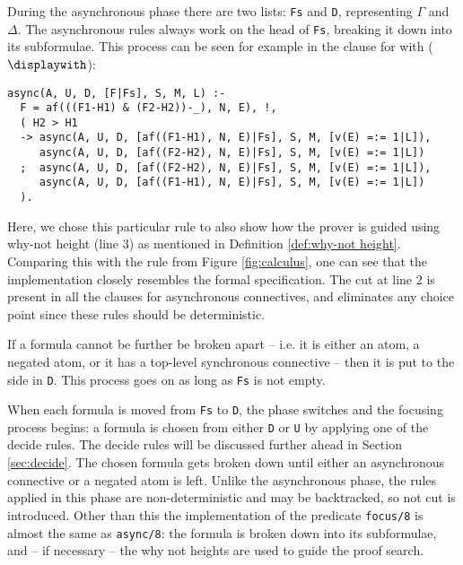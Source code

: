 During the asynchronous phase there are two lists: \texttt{Fs} and \texttt{D}, representing $\Gamma$ and $\Delta$.
The asynchronous rules always work on the head of \texttt{Fs}, breaking it down into its subformulae.
This process can be seen for example in the clause for with ($\displaywith$):
\begin{verbatim}
async(A, U, D, [F|Fs], S, M, L) :-
  F = af(((F1-H1) & (F2-H2))-_), N, E), !,
  ( H2 > H1	
  -> async(A, U, D, [af((F1-H1), N, E)|Fs], S, M, [v(E) =:= 1|L]), 
     async(A, U, D, [af((F2-H2), N, E)|Fs], S, M, [v(E) =:= 1|L]) 
  ;  async(A, U, D, [af((F2-H2), N, E)|Fs], S, M, [v(E) =:= 1|L]),
     async(A, U, D, [af((F1-H1), N, E)|Fs], S, M, [v(E) =:= 1|L])
  ).
\end{verbatim}
Here, we chose this particular rule to also show how the prover is guided using why-not height (line 3) as mentioned in Definition \ref{def:why-not height}.
Comparing this with the \derRule{\displaywith} rule from Figure \ref{fig:calculus}, one can see that the implementation closely resembles the formal specification.
The cut at line 2 is present in all the clauses for asynchronous connectives, and eliminates any choice point since these rules should be deterministic.

If a formula cannot be further be broken apart -- i.e. it is either an atom, a negated atom, or it has a top-level synchronous connective -- then it is put to the side in \texttt{D}.
This process goes on as long as \texttt{Fs} is not empty.

When each formula is moved from \texttt{Fs} to \texttt{D}, the phase switches and the focusing process begins: a formula is chosen from either \texttt{D} or \texttt{U} by applying one of the decide rules.
The decide rules will be discussed further ahead in Section \ref{sec:decide}.
The chosen formula gets broken down until either an asynchronous connective or a negated atom is left. 
Unlike the asynchronous phase, the rules applied in this phase are non-deterministic and may be backtracked, so not cut is introduced.
Other than this the implementation of the predicate \texttt{focus/8} is almost the same as \texttt{async/8}: the formula is broken down into its subformulae, and -- if necessary -- the why not heights are used to guide the proof search.

